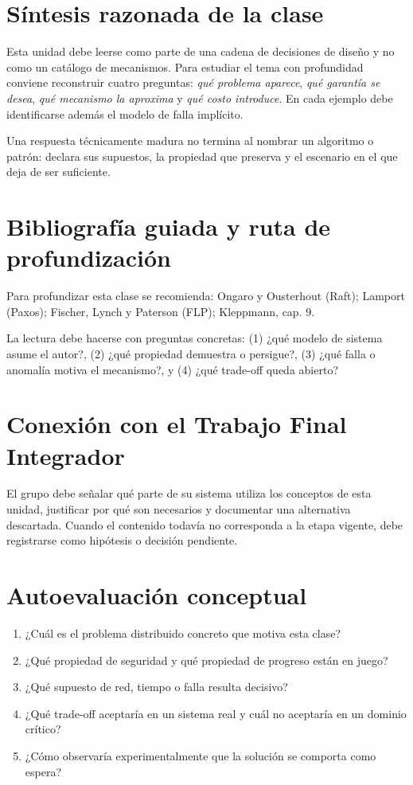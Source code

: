\documentclass[variant=apuntes,cover=institutional,mode=screen]{ua-engineering-v6-article}
\begin{document}
\section{Síntesis razonada de la clase}
Esta unidad debe leerse como parte de una cadena de decisiones de diseño y no como un catálogo de mecanismos. Para estudiar el tema con profundidad conviene reconstruir cuatro preguntas: \emph{qué problema aparece}, \emph{qué garantía se desea}, \emph{qué mecanismo la aproxima} y \emph{qué costo introduce}. En cada ejemplo debe identificarse además el modelo de falla implícito.

\begin{uakeybox}
Una respuesta técnicamente madura no termina al nombrar un algoritmo o patrón: declara sus supuestos, la propiedad que preserva y el escenario en el que deja de ser suficiente.
\end{uakeybox}

\section{Bibliografía guiada y ruta de profundización}
Para profundizar esta clase se recomienda: Ongaro y Ousterhout (Raft); Lamport (Paxos); Fischer, Lynch y Paterson (FLP); Kleppmann, cap. 9.

La lectura debe hacerse con preguntas concretas: (1) ¿qué modelo de sistema asume el autor?, (2) ¿qué propiedad demuestra o persigue?, (3) ¿qué falla o anomalía motiva el mecanismo?, y (4) ¿qué trade-off queda abierto?

\section{Conexión con el Trabajo Final Integrador}
El grupo debe señalar qué parte de su sistema utiliza los conceptos de esta unidad, justificar por qué son necesarios y documentar una alternativa descartada. Cuando el contenido todavía no corresponda a la etapa vigente, debe registrarse como hipótesis o decisión pendiente.

\section{Autoevaluación conceptual}
\begin{enumerate}
\item ¿Cuál es el problema distribuido concreto que motiva esta clase?
\item ¿Qué propiedad de seguridad y qué propiedad de progreso están en juego?
\item ¿Qué supuesto de red, tiempo o falla resulta decisivo?
\item ¿Qué trade-off aceptaría en un sistema real y cuál no aceptaría en un dominio crítico?
\item ¿Cómo observaría experimentalmente que la solución se comporta como espera?
\end{enumerate}
\end{document}
